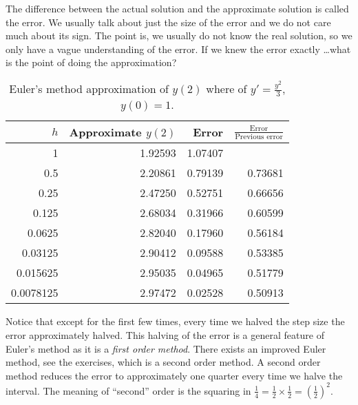 \documentclass{ximera}
\begin{document}
The difference between the actual solution and the approximate solution is called the error.  We usually talk about just the size of the error and we do not care much about its sign.  The point is, we usually do not know the real solution, so we only have a vague understanding of the error.  If we knew the error exactly \ldots what is the point of doing the approximation?

\begin{table}[h!t]
    \mybeginframe
    \capstart
    \begin{center}
        \begin{tabular}{@{}rrrr@{}}
            \toprule
            $h$ & Approximate $y(2)$ & Error & $\frac{\text{Error}}{\text{Previous error}}$ \\
            \midrule
            1        & 1.92593 & 1.07407 & \\
            0.5      & 2.20861 & 0.79139 & 0.73681 \\
            0.25     & 2.47250 & 0.52751 & 0.66656 \\
            0.125    & 2.68034 & 0.31966 & 0.60599 \\
            0.0625   & 2.82040 & 0.17960 & 0.56184 \\
            0.03125  & 2.90412 & 0.09588 & 0.53385 \\
            0.015625 & 2.95035 & 0.04965 & 0.51779 \\
            0.0078125& 2.97472 & 0.02528 & 0.50913 \\
            \bottomrule
        \end{tabular}
    \end{center}
    \caption{Euler's method approximation of $y(2)$ where of $y'=\frac{y^2}{3}$, $y(0)=1$.\label{euler-table:table}}
    \myendframe
\end{table}

Notice that except for the first few times, every time we halved the step size the error approximately halved. This halving of the error is a general feature of Euler's method as it is a
\emph{first order method}. 
There exists an improved Euler method, see the exercises, which is a second order method. A second order method reduces the error to approximately one quarter every time we halve the interval.  The meaning of ``second'' order is the squaring in $\frac{1}{4} = \frac{1}{2} \times \frac{1}{2} = {(\frac{1}{2})}^2$.
\end{document}
